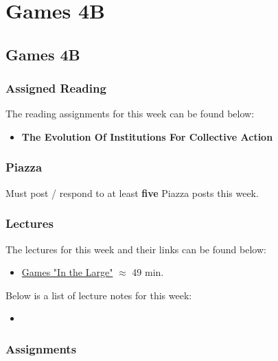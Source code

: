 \clearpage

\renewcommand{\ChapTitle}{Games 4B}
\renewcommand{\SectionTitle}{Games 4B}

\chapter{\ChapTitle}
\section{\SectionTitle}

\subsection{Assigned Reading}

The reading assignments for this week can be found below:

\begin{itemize}
    \item \textbf{The Evolution Of Institutions For Collective Action}
\end{itemize}

\subsection{Piazza}

Must post / respond to at least \textbf{five} Piazza posts this week.

\subsection{Lectures}

The lectures for this week and their links can be found below:

\begin{itemize}
    \item \href{https://www.youtube.com/watch?v=JiY4qqxsVag}{Games "In the Large"} $\approx$ 49 min.
\end{itemize}

\noindent Below is a list of lecture notes for this week:

\begin{itemize}
    \item {}
\end{itemize}

\subsection{Assignments}

